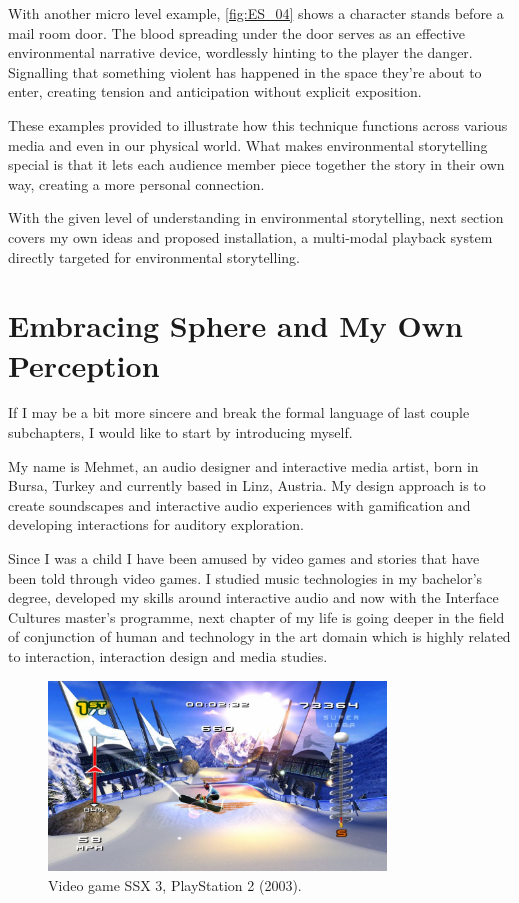         With another micro level example, \ref{fig:ES_04} shows a character stands before a mail room door. The blood spreading under the door serves as an effective environmental narrative device, wordlessly hinting to the player the danger. Signalling that something violent has happened in the space they're about to enter, creating tension and anticipation without explicit exposition.\par    

        These examples provided to illustrate how this technique functions across various media and even in our physical world. What makes environmental storytelling special is that it lets each audience member piece together the story in their own way, creating a more personal connection.\par

        With the given level of understanding in environmental storytelling, next section covers my own ideas and proposed installation, a multi-modal playback system directly targeted for environmental storytelling.\par
    \section{Embracing Sphere and My Own Perception} 
        If I may be a bit more sincere and break the formal language of last couple subchapters, I would like to start by introducing myself.\par 
        
        My name is Mehmet, an audio designer and interactive media artist, born in Bursa, Turkey and currently based in Linz, Austria. My design approach is to create soundscapes and interactive audio experiences with gamification and developing interactions for auditory exploration.\par

        Since I was a child I have been amused by video games and stories that have been told through video games. I studied music technologies in my bachelor's degree, developed my skills around interactive audio and now with the Interface Cultures master's programme, next chapter of my life is going deeper in the field of conjunction of human and technology in the art domain which is highly related to interaction, interaction design and media studies.\par

        \begin{figure}[H]
        \centering
        \includegraphics[width=0.8\textwidth]{images/ssx3}
        \caption{Video game SSX 3, PlayStation 2 (2003).}
        \label{fig:SSX3}
        \end{figure}

